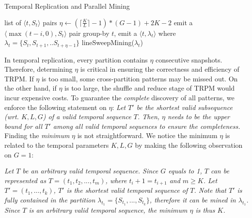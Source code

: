 \begin{algorithm}
\caption{Temporal Replication and Parallel Mining}
\label{algo:trm_overview}
\begin{algorithmic}[1]
\Require list of $\langle t, S_t \rangle$ pairs
\State $\eta \gets (\lceil \frac{K}{L} \rceil -1)*(G-1)+2K-2$
\label{code:trm-map-start}
		\State emit a $\langle \max(t-i,0), S_t \rangle$ pair
	\EndFor  
\EndFor
\label{code:trm-map-end}
\label{code:trm-par-start}
\State group-by $t$, emit a $\langle t, \lambda_t\rangle$
\State where $\lambda_t = \{S_t, S_{t+1}, .. S_{t+\eta-1}\} $
\EndFor
\label{code:trm-par-end}
\label{code:trm-red-start}
\State lineSweepMining($\lambda_t$)
\label{code:trm-red-end}
\EndFor
\end{algorithmic}
\end{algorithm}

In temporal replication, every partition
contains $\eta$ consecutive snapshots.
Therefore, determining $\eta$ is critical in ensuring the
correctness and efficiency of TRPM.
If $\eta$ is too small, some cross-partition patterns may be missed out. 
On the other hand, if $\eta$ is too large, the shuffle and reduce
stage of TRPM would incur expensive costs.
To guarantee the \emph{complete} discovery of all patterns, we enforce the
following statement on $\eta$: \emph{Let $T'$ be the \emph{shortest} 
valid subsequence (wrt. $K,L,G$) of a valid temporal sequence $T$. 
Then, $\eta$ needs to be the upper bound for all $T'$ among all valid temporal sequences to ensure the completeness.} 
Finding the \emph{minimum} $\eta$ is not
straightforward. We notice the minimum $\eta$ is related to the temporal
parameters $K,L,G$ by making the following observation on $G=1$:

\emph{
Let $T$ be an arbitrary valid temporal sequence. Since $G$ equals to 1,
$T$ can be represented as $T=(t_1, t_2,...,t_m)$, where
$t_i +1 = t_{i+1}$ and $m \geq K$. Let $T' = (t_1,...,t_k)$, $T'$ is the shortest
valid temporal sequence of $T$. Note that $T'$ is fully contained
in the partition $\lambda_{t_1} = \{S_{t_1},...,S_{t_k}\}$, therefore it can be
mined in $\lambda_{t_1}$. 
Since $T$ is an arbitrary valid temporal sequence, the minimum $\eta$ is thus $K$.
}

